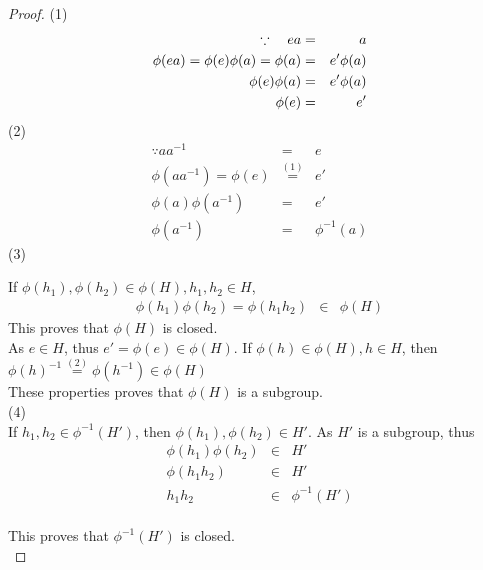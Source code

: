 \documentclass{article}
\theoremstyle{MyNonumberplain}
\theoremstyle{break}
\newtheorem*{proof}{Proof. }
\newcommand{\p}{\phi}
\newcommand{\xequal}[1]{\stackrel{#1}{=}}
\theoremstyle{break}
\theoremstyle{break}
\theoremstyle{definition}
\theoremstyle{break}
\begin{document}
\begin{thmbox}
    \begin{prfbox}
        \begin{proof}
            (1)
            \begin{eqnarray*}
            \because \text{\quad} e a & = & a\\
            \p (e a) = \p (e) \p (a) = \p (a) & = & e' \p (a)\\
            \p (e) \p (a) & = & e' \p (a)\\
            \p (e) & = & e'
            \end{eqnarray*}
            (2)
            \begin{eqnarray*}
            \because a a^{- 1} & = & e\\
            \p (a a^{- 1}) = \p (e) & \xequal{(1)} & e'\\
            \p (a) \p (a^{- 1}) & = & e'\\
            \p (a^{- 1}) & = & \p^{- 1} (a)
            \end{eqnarray*}
            (3)

            If $\p (h_1), \p (h_2) \in \p (H), h_1, h_2 \in H$,
            \begin{eqnarray*}
            \p (h_1) \p (h_2) = \p (h_1 h_2) & \in & \p (H)
            \end{eqnarray*}
            This proves that $\p (H)$ is closed.\\

            As $e \in H$, thus $e' = \p (e) \in \p (H)$. If $\p (h) \in \p (H), h \in H$,
            then $\p (h)^{- 1} \xequal{(2)} \p (h^{- 1}) \in \p (H) $\\

            These properties proves that $\p (H)$ is a subgroup.\\

            (4)\\

            If $h_1, h_2 \in \p^{- 1} (H')$, then $\p (h_1), \p (h_2) \in H'$. As $H'$ is
            a subgroup, thus\\
            \begin{eqnarray*}
            \p (h_1) \p (h_2) & \in & H'\\
            \p (h_1 h_2) & \in & H'\\
            h_1 h_2 & \in & \p^{- 1} (H')
            \end{eqnarray*}\\
            This proves that $\p^{- 1} (H')$ is closed.\\


\end{proof}
\end{prfbox}
\end{thmbox}
\end{document}
